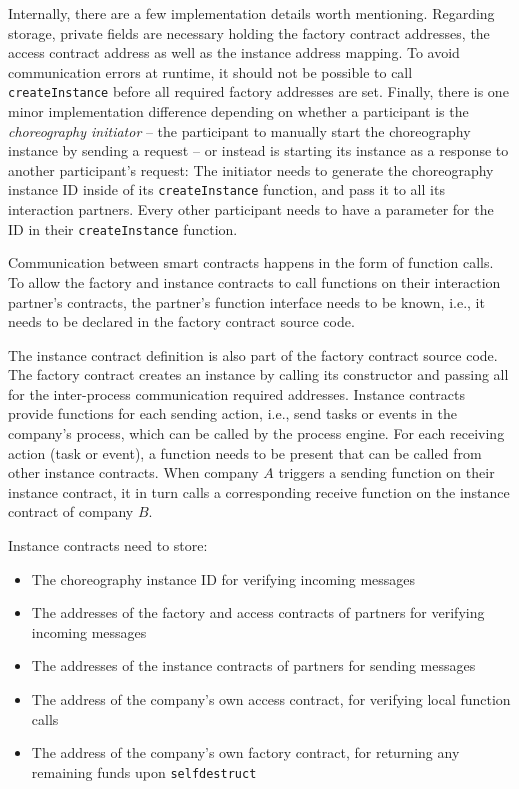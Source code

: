 \documentclass[runningheads]{llncs}
\begin{document}
Internally, there are a few implementation details worth mentioning.
Regarding storage, private fields are necessary holding the factory contract addresses, the access contract address as well as the instance address mapping.
To avoid communication errors at runtime, it should not be possible to call \texttt{createInstance} before all required factory addresses are set.
Finally, there is one minor implementation difference depending on whether a participant is the \emph{choreography initiator} -- the participant to manually start the choreography instance by sending a request -- or instead is starting its instance as a response to another participant's request: %
The initiator needs to generate the choreography instance ID inside of its \texttt{createInstance} function, and pass it to all its interaction partners.
Every other participant needs to have a parameter for the ID in their \texttt{createInstance} function.

Communication between smart contracts happens in the form of function calls.
To allow the factory and instance contracts to call functions on their interaction partner's contracts, the partner's function interface needs to be known, i.e., it needs to be declared in the factory contract source code.

The instance contract definition is also part of the factory contract source code.
The factory contract creates an instance by calling its constructor and passing all for the inter-process communication required addresses.
Instance contracts provide functions for each sending action, i.e., send tasks or events in the company's process, which can be called by the process engine.
For each receiving action (task or event), a function needs to be present that can be called from other instance contracts.
When company $A$ triggers a sending function on their instance contract, it in turn calls a corresponding receive function on the instance contract of company $B$.

Instance contracts need to store:
\begin{itemize}
	\item The choreography instance ID for verifying incoming messages
	\item The addresses of the factory and access contracts of partners for verifying incoming messages
	\item The addresses of the instance contracts of partners for sending messages
	\item The address of the company's own access contract, for verifying local function calls
	\item The address of the company's own factory contract, for returning any remaining funds upon \texttt{selfdestruct}
\end{itemize}
\end{document}
